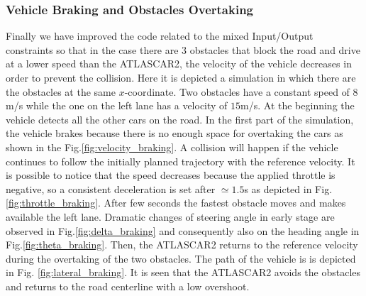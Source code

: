 \documentclass[conference, 11pt]{IEEEtran}
\begin{document}
\subsubsection{Vehicle Braking and Obstacles Overtaking}
Finally we have improved the code related to the mixed Input/Output constraints so that in the case there are 3 obstacles that block the road and drive at a lower speed than the ATLASCAR2, the velocity of the vehicle decreases in order to prevent the collision. Here it is depicted a simulation in which there are the obstacles at the same $x$-coordinate. Two obstacles have a constant speed of $8$m/s while the one on the left lane has a velocity of $15$m/s. At the beginning the vehicle detects all the other cars on the road. In the first part of the simulation, the vehicle brakes because there is no enough space for overtaking the cars as shown in the Fig.\ref{fig:velocity_braking}. A collision will
happen if the vehicle continues to follow the initially planned trajectory with the reference velocity. It is possible to notice that the speed decreases because the applied throttle is negative, so a consistent deceleration is set after $\simeq1.5$s as depicted in Fig.\ref{fig:throttle_braking}. After few seconds the fastest obstacle moves and makes available the left lane. Dramatic changes of steering angle in early stage are observed in Fig.\ref{fig:delta_braking} and consequently also on the heading angle in Fig.\ref{fig:theta_braking}. Then, the ATLASCAR2 returns to the reference velocity during the overtaking of the two obstacles. The path of the vehicle is is depicted in Fig. \ref{fig:lateral_braking}. It is seen that the ATLASCAR2 avoids the  obstacles and returns to the road  centerline with a low overshoot.
\end{document}
